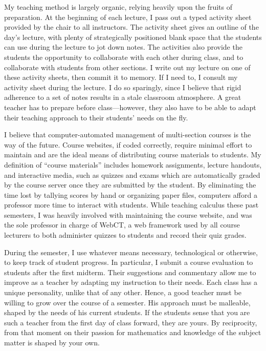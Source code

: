 \documentclass[12pt,reqno]{article}
\begin{document}
My teaching method is largely
organic, relying heavily upon the fruits of preparation. At the beginning of
each lecture, I pass out a typed activity sheet provided by the chair to all
instructors. The activity sheet gives an outline of the day's lecture, with
plenty of strategically positioned blank space that the students can use during
the lecture to jot down notes. The activities also provide the students the
opportunity to collaborate with each other during class, and to collaborate with
students from other sections. I write out my lecture on one of these activity
sheets, then commit it to memory. If I need to, I consult my activity sheet
during the lecture. I do so sparingly, since I believe that rigid adherence to a
set of notes results in a stale classroom atmosphere. A great teacher has to prepare before class---however, they also have to be able to adapt their teaching approach to their students' needs on the fly. 

I believe that computer-automated management of multi-section courses is the
way of the future.
Course websites, if coded correctly, require minimal effort to maintain and are
the ideal means of distributing course materials to students. My definition of
``course materials'' includes homework assignments, lecture
handouts, and interactive media, such as quizzes and exams which are
automatically graded by the course server once they are submitted by the
student. By eliminating the time lost by tallying scores by hand or organizing
paper files, computers afford a professor more time to interact with students.
While teaching calculus these past semesters, I was heavily involved
with maintaining the course website, and was the sole professor in charge of
WebCT, a web framework used by all course lecturers to both administer quizzes
to students and record their quiz grades.

During the semester, I use whatever means necessary, technological
or otherwise, to keep track of student progress. In particular, I submit a
course evaluation to students after the first midterm. Their suggestions and
commentary allow me to improve as a teacher by
adapting my instruction to their needs. Each class has a unique personality,
unlike that of any other. Hence, a good teacher must be willing to grow over the
course of a semester. His approach must be malleable, shaped by the needs of his
current students. If the students sense that you are such a teacher from the first
day of class forward, they are yours. By reciprocity, from that moment on their
passion for mathematics and knowledge of the subject matter is shaped by your own. 
\end{document}
